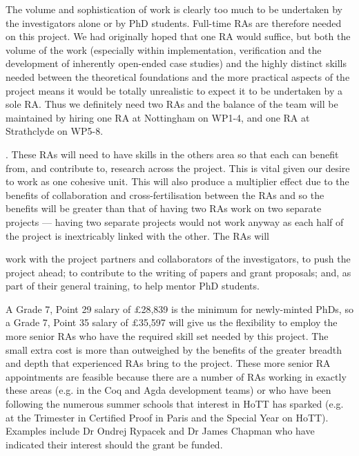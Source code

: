 \documentclass[a4paper,11pt]{article}
\begin{document}
\vspace{0.02in}



The volume and sophistication of work is clearly too much to be
undertaken by the investigators alone or by PhD students.  Full-time
RAs are therefore needed on this project. We had originally hoped that
one RA would suffice, but both the volume of the work (especially
within implementation, verification and the development of inherently
open-ended case studies) and the highly distinct skills needed between
the theoretical foundations and the more practical aspects of the
project means it would be totally unrealistic to expect it to be
undertaken by a sole RA. Thus we definitely need two RAs and the
balance of the team will be maintained by hiring one RA at Nottingham
on WP1-4, and one RA at Strathclyde on WP5-8.


. These RAs
will need to have skills in the others area so that each can
benefit from, and contribute to, research across the project. This is
vital given our desire to work as one cohesive unit. This will also
produce a multiplier effect due to the benefits of collaboration and
cross-fertilisation between the RAs and so the benefits will be
greater than that of having two RAs work on two separate projects ---
having two separate projects would not work anyway as each half of the
project is inextricably linked with the other. The RAs will 


work with
the project partners and collaborators of the investigators, to push
the project ahead; to contribute to the writing of papers and grant
proposals; and, as part of their general training, to help mentor PhD
students. 


A Grade 7, Point 29 salary of $\pounds$28,839 is the minimum
for newly-minted PhDs, so a Grade 7, Point 35 salary of
$\pounds$35,597 will give us the flexibility to employ the more senior
RAs who have the required skill set needed by this project. The
small extra cost is more than outweighed by the benefits of the
greater breadth and depth that experienced RAs bring to the
project. These more
senior RA appointments are feasible because there are a number of RAs
working in exactly these areas (e.g. in the Coq and Agda development
teams) or who have been following the numerous summer schools that
interest in HoTT has sparked (e.g. at the Trimester in Certified Proof
in Paris and the Special Year on HoTT). Examples include Dr Ondrej
Rypacek and Dr James Chapman who have indicated their interest should the grant be funded.
\end{document}
